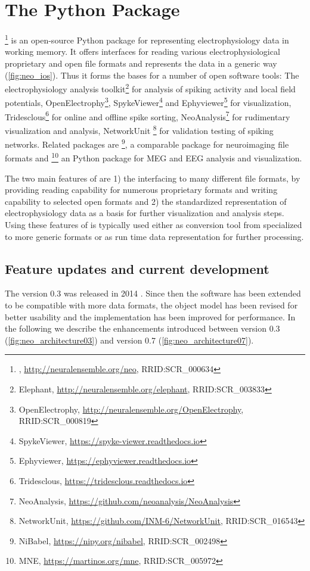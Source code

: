 \section{The  Python Package}
\footnote{, \url{http://neuralensemble.org/neo}, RRID:SCR\_000634} \citep{Garcia_2014} is an open-source Python package for representing electrophysiology data in working memory. It offers interfaces for reading various electrophysiological proprietary and open file formats and represents the data in a generic way (\cref{fig:neo_ios}). Thus it forms the bases for a number of open software tools: The electrophysiology analysis toolkit\footnote{Elephant, \url{http://neuralensemble.org/elephant}, RRID:SCR\_003833} for analysis of spiking activity and local field potentials, OpenElectrophy\footnote{OpenElectrophy, \url{http://neuralensemble.org/OpenElectrophy}, RRID:SCR\_000819}, SpykeViewer\footnote{SpykeViewer, \url{https://spyke-viewer.readthedocs.io}} and Ephyviewer\footnote{Ephyviewer, \url{https://ephyviewer.readthedocs.io}} for visualization, Tridesclous\footnote{Tridesclous, \url{https://tridesclous.readthedocs.io}} for online and offline spike sorting, NeoAnalysis\footnote{NeoAnalysis, \url{https://github.com/neoanalysis/NeoAnalysis}} \citep{Zhang_2017} for rudimentary visualization and analysis, NetworkUnit \footnote{NetworkUnit, \url{https://github.com/INM-6/NetworkUnit}, RRID:SCR\_016543} for validation testing of spiking networks. Related packages are \footnote{NiBabel, \url{https://nipy.org/nibabel}, RRID:SCR\_002498}, a comparable package for neuroimaging file formats and \footnote{MNE, \url{https://martinos.org/mne}, RRID:SCR\_005972} an Python package for MEG and EEG analysis and visualization.

The two main features of  are 1) the interfacing to many different file formats, by providing reading capability for numerous proprietary formats and writing capability to selected open formats and 2) the standardized representation of electrophysiology data as a basis for further visualization and analysis steps. Using these features of  is typically used either as conversion tool from specialized to more generic formats or as run time data representation for further processing.

\subsection{Feature updates and current development}
The  version 0.3 was released in 2014 \citep{Garcia_2014}. Since then the software has been extended to be compatible with more data formats, the object model has been revised for better usability and the implementation has been improved for performance. In the following we describe the enhancements introduced between version 0.3 (\cref{fig:neo_architecture03}) and version 0.7 (\cref{fig:neo_architecture07}).

